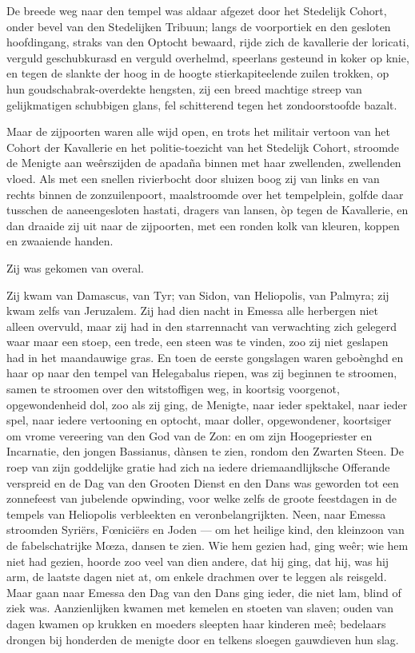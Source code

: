 \documentclass[a4paper, 12pt, oneside, dutch]{article}
\begin{document}
De breede weg naar den tempel was aldaar afgezet door het Stedelijk Cohort, onder bevel van den Stedelijken Tribuun; langs de voorportiek en den gesloten hoofdingang, straks van den Optocht bewaard, rijde zich de kavallerie der loricati, verguld geschubkurasd en verguld overhelmd, speerlans gesteund in koker op knie, en tegen de slankte der hoog in de hoogte stierkapiteelende zuilen trokken, op hun goudschabrak-overdekte hengsten, zij een breed machtige streep van gelijkmatigen schubbigen glans, fel schitterend tegen het zondoorstoofde bazalt.

Maar de zijpoorten waren alle wijd open, en trots het militair vertoon van het Cohort der Kavallerie en het politie-toezicht van het Stedelijk Cohort, stroomde de Menigte aan weêrszijden de apadaña binnen met haar zwellenden, zwellenden vloed. Als met een snellen rivierbocht door sluizen boog zij van links en van rechts binnen de zonzuilenpoort, maalstroomde over het tempelplein, golfde daar tusschen de aaneengesloten hastati, dragers van lansen, òp tegen de Kavallerie, en dan draaide zij uit naar de zijpoorten, met een ronden kolk van kleuren, koppen en zwaaiende handen.

Zij was gekomen van overal.

Zij kwam van Damascus, van Tyr; van Sidon, van Heliopolis, van Palmyra; zij kwam zelfs van Jeruzalem. Zij had dien nacht in Emessa alle herbergen niet alleen overvuld, maar zij had in den starrennacht van verwachting zich gelegerd waar maar een stoep, een trede, een steen was te vinden, zoo zij niet geslapen had in het maandauwige gras. En toen de eerste gongslagen waren geboènghd en haar op naar den tempel van Helegabalus riepen, was zij beginnen te stroomen, samen te stroomen over den witstoffigen weg, in koortsig voorgenot, opgewondenheid dol, zoo als zij ging, de Menigte, naar ieder spektakel, naar ieder spel, naar iedere vertooning en optocht, maar doller, opgewondener, koortsiger om vrome vereering van den God van de Zon: en om zijn Hoogepriester en Incarnatie, den jongen Bassianus, dànsen te zien, rondom den Zwarten Steen. De roep van zijn goddelijke gratie had zich na iedere driemaandlijksche Offerande verspreid en de Dag van den Grooten Dienst en den Dans was geworden tot een zonnefeest van jubelende opwinding, voor welke zelfs de groote feestdagen in de tempels van Heliopolis verbleekten en veronbelangrijkten. Neen, naar Emessa stroomden Syriërs, Fœniciërs en Joden --- om het heilige kind, den kleinzoon van de fabelschatrijke Mœza, dansen te zien. Wie hem gezien had, ging weêr; wie hem niet had gezien, hoorde zoo veel van dien andere, dat hij ging, dat hij, was hij arm, de laatste dagen niet at, om enkele drachmen over te leggen als reisgeld. Maar gaan naar Emessa den Dag van den Dans ging ieder, die niet lam, blind of ziek was. Aanzienlijken kwamen met kemelen en stoeten van slaven; ouden van dagen kwamen op krukken en moeders sleepten haar kinderen meê; bedelaars drongen bij honderden de menigte door en telkens sloegen gauwdieven hun slag.
\end{document}

